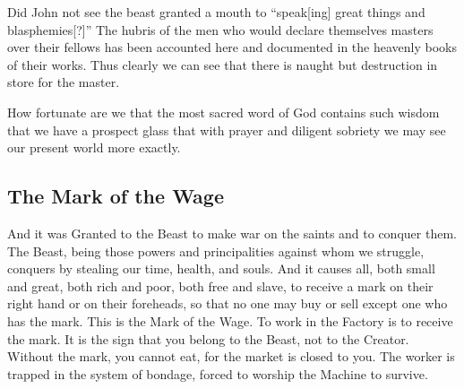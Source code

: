 Did John not see the beast granted a mouth to ``speak[ing] great things and blasphemies[?]''
The hubris of the men who would declare themselves masters over their fellows has been accounted here and documented in the heavenly books of their works.
Thus clearly we can see that there is naught but destruction in store for the master.

How fortunate are we that the most sacred word of God contains such wisdom that we have a prospect glass  that with prayer and diligent sobriety we may see our present world more exactly.

\subsection{The Mark of the Wage}

And it was Granted to the Beast to make war on the saints and to conquer them. 
The Beast, being those powers and principalities against whom we struggle, conquers by stealing our time, health, and souls.
And it causes all, both small and great, both rich and poor, both free and slave, to receive a mark on their right hand or on their foreheads,
so that no one may buy or sell except one who has the mark.
This is the Mark of the Wage.
To work in the Factory is to receive the mark.
It is the sign that you belong to the Beast, not to the Creator.
Without the mark, you cannot eat, for the market is closed to you.
The worker is trapped in the system of bondage, forced to worship the Machine to
survive.


